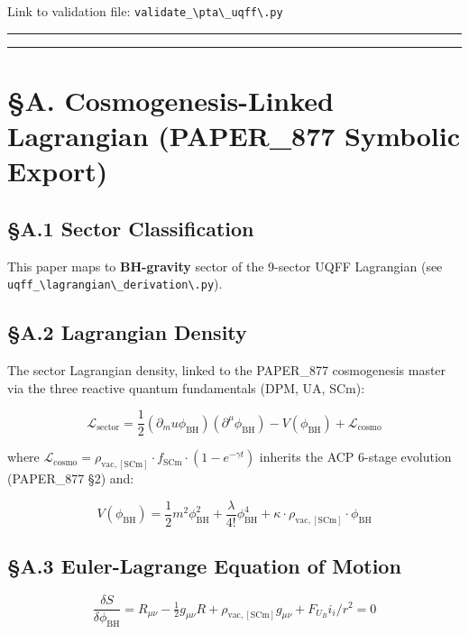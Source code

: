 \documentclass[12pt,a4paper]{article}
\begin{document}
Link to validation file: \texttt{validate\_\textbackslash {pta\textbackslash \_uqff\textbackslash }.py}

\medskip\hrule\medskip

\medskip\hrule\medskip

\section{\S{}A. Cosmogenesis-Linked Lagrangian (PAPER\_877 Symbolic Export)}

\subsection{\S{}A.1 Sector Classification}

This paper maps to \textbf{BH-gravity} sector of the 9-sector UQFF Lagrangian (see \texttt{uqff\_\textbackslash {lagrangian\textbackslash \_derivation\textbackslash }.py}).

\subsection{\S{}A.2 Lagrangian Density}

The sector Lagrangian density, linked to the PAPER\_877 cosmogenesis master via the three reactive quantum fundamentals (DPM, UA, SCm):

\begin{equation}
\mathcal{L}_{\mathrm{sector}} = \frac{1}{2}(\partial_mu \phi_{\mathrm{BH}})(\partial^\mu \phi_{\mathrm{BH}}) - V(\phi_{\mathrm{BH}}) + \mathcal{L}_{\mathrm{cosmo}}
\end{equation}

where $\mathcal{L}_{\mathrm{cosmo}} = \rho_{\mathrm{vac,[SCm]}} \cdot f_{\mathrm{SCm}} \cdot (1 - e^{-\gamma t})$ inherits the ACP 6-stage evolution (PAPER\_877 \S{}2) and:

\begin{equation}
V(\phi_{\mathrm{BH}}) = \frac{1}{2} m^2 \phi_{\mathrm{BH}}^2 + \frac{\lambda}{4!} \phi_{\mathrm{BH}}^4 + \kappa \cdot \rho_{\mathrm{vac,[SCm]}} \cdot \phi_{\mathrm{BH}}
\end{equation}

\subsection{\S{}A.3 Euler-Lagrange Equation of Motion}

\begin{equation}
\boxed{\frac{\delta S}{\delta \phi_{\mathrm{BH}}} = R_{\mu\nu} - \tfrac{1}{2}g_{\mu\nu}R + \rho_{\mathrm{vac,[SCm]}} g_{\mu\nu} + F_U_Bi_i/r^2 = 0}
\end{equation}
\end{document}
